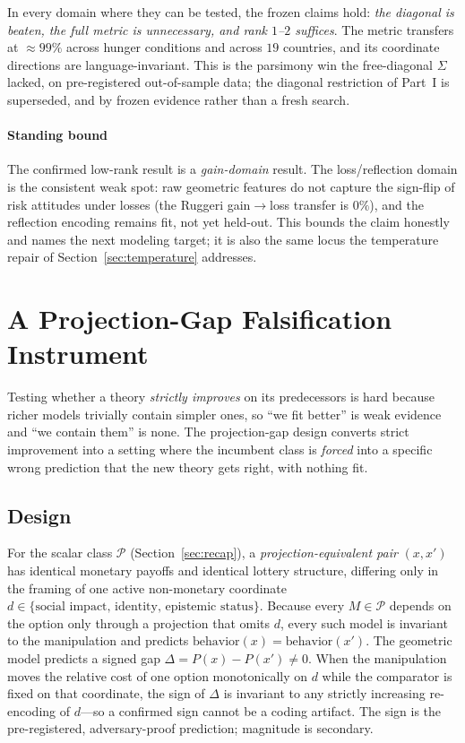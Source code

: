 \documentclass[journal]{IEEEtran}
\newcommand{\Pclass}{\mathcal{P}}          %
\begin{document}
In every domain where they can be tested, the frozen claims hold: \emph{the diagonal is beaten, the full metric is unnecessary, and rank $1$--$2$ suffices}.
The metric transfers at $\approx99\%$ across hunger conditions and across $19$ countries, and its coordinate directions are language-invariant.
This is the parsimony win the free-diagonal $\Sigma$ lacked, on pre-registered out-of-sample data; the diagonal restriction of Part~I is superseded, and by frozen evidence rather than a fresh search.

\paragraph{Standing bound}
The confirmed low-rank result is a \emph{gain-domain} result.
The loss/reflection domain is the consistent weak spot: raw geometric features do not capture the sign-flip of risk attitudes under losses (the Ruggeri gain$\to$loss transfer is $0\%$), and the reflection encoding remains fit, not yet held-out.
This bounds the claim honestly and names the next modeling target; it is also the same locus the temperature repair of Section~\ref{sec:temperature} addresses.

\section{A Projection-Gap Falsification Instrument}
\label{sec:projgap}

Testing whether a theory \emph{strictly improves} on its predecessors is hard because richer models trivially contain simpler ones, so ``we fit better'' is weak evidence and ``we contain them'' is none.
The projection-gap design converts strict improvement into a setting where the incumbent class is \emph{forced} into a specific wrong prediction that the new theory gets right, with nothing fit.

\subsection{Design}
For the scalar class $\Pclass$ (Section~\ref{sec:recap}), a \emph{projection-equivalent pair} $(x,x')$ has identical monetary payoffs and identical lottery structure, differing only in the framing of one active non-monetary coordinate $d\in\{\text{social impact, identity, epistemic status}\}$.
Because every $M\in\Pclass$ depends on the option only through a projection that omits $d$, every such model is invariant to the manipulation and predicts $\text{behavior}(x)=\text{behavior}(x')$.
The geometric model predicts a signed gap $\Delta=P(x)-P(x')\neq0$.
When the manipulation moves the relative cost of one option monotonically on $d$ while the comparator is fixed on that coordinate, the sign of $\Delta$ is invariant to any strictly increasing re-encoding of $d$---so a confirmed sign cannot be a coding artifact.
The sign is the pre-registered, adversary-proof prediction; magnitude is secondary.
\end{document}
